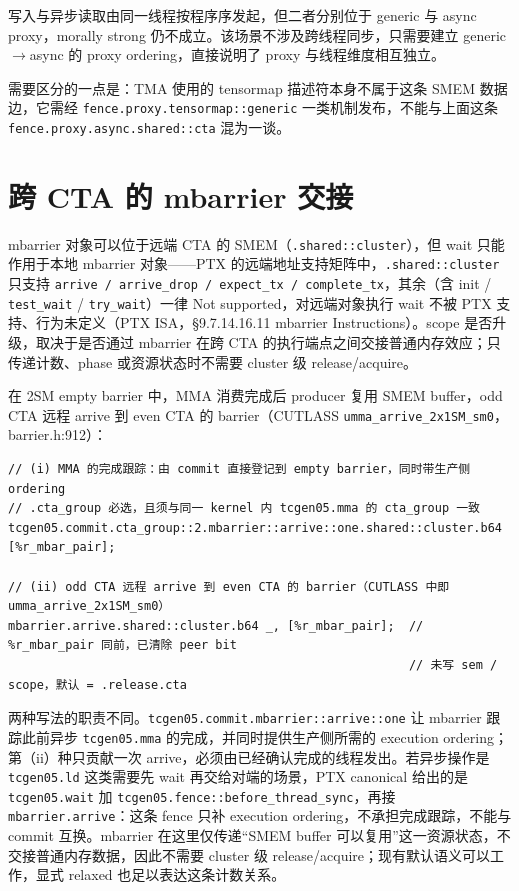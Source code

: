 写入与异步读取由同一线程按程序序发起，但二者分别位于 generic 与 async proxy，morally strong 仍不成立。该场景不涉及跨线程同步，只需要建立 generic$\rightarrow$async 的 proxy ordering，直接说明了 proxy 与线程维度相互独立。

需要区分的一点是：TMA 使用的 tensormap 描述符本身不属于这条 SMEM 数据边，它需经 \lstinline|fence.proxy.tensormap::generic| 一类机制发布，不能与上面这条 \lstinline|fence.proxy.async.shared::cta| 混为一谈。

\section{跨 CTA 的 mbarrier 交接}

mbarrier 对象可以位于远端 CTA 的 SMEM（\lstinline|.shared::cluster|），但 wait 只能作用于本地 mbarrier 对象——PTX 的远端地址支持矩阵中，\lstinline|.shared::cluster| 只支持 \lstinline|arrive / arrive_drop / expect_tx / complete_tx|，其余（含 init / \lstinline|test_wait| / \lstinline|try_wait|）一律 Not supported，对远端对象执行 wait 不被 PTX 支持、行为未定义（PTX ISA，§9.7.14.16.11 mbarrier Instructions）。scope 是否升级，取决于是否通过 mbarrier 在跨 CTA 的执行端点之间交接普通内存效应；只传递计数、phase 或资源状态时不需要 cluster 级 release/acquire。

在 2SM empty barrier 中，MMA 消费完成后 producer 复用 SMEM buffer，odd CTA 远程 arrive 到 even CTA 的 barrier（CUTLASS \lstinline|umma_arrive_2x1SM_sm0|，barrier.h:912）：

\begin{lstlisting}
// (i) MMA 的完成跟踪：由 commit 直接登记到 empty barrier，同时带生产侧 ordering
// .cta_group 必选，且须与同一 kernel 内 tcgen05.mma 的 cta_group 一致
tcgen05.commit.cta_group::2.mbarrier::arrive::one.shared::cluster.b64 [%r_mbar_pair];

// (ii) odd CTA 远程 arrive 到 even CTA 的 barrier（CUTLASS 中即 umma_arrive_2x1SM_sm0）
mbarrier.arrive.shared::cluster.b64 _, [%r_mbar_pair];  // %r_mbar_pair 同前，已清除 peer bit
                                                        // 未写 sem / scope，默认 = .release.cta
\end{lstlisting}

两种写法的职责不同。\lstinline|tcgen05.commit.mbarrier::arrive::one| 让 mbarrier 跟踪此前异步 \lstinline|tcgen05.mma| 的完成，并同时提供生产侧所需的 execution ordering；第（ii）种只贡献一次 arrive，必须由已经确认完成的线程发出。若异步操作是 \lstinline|tcgen05.ld| 这类需要先 wait 再交给对端的场景，PTX canonical 给出的是 \lstinline|tcgen05.wait| 加 \lstinline|tcgen05.fence::before_thread_sync|，再接 \lstinline|mbarrier.arrive|：这条 fence 只补 execution ordering，不承担完成跟踪，不能与 commit 互换。mbarrier 在这里仅传递“SMEM buffer 可以复用”这一资源状态，不交接普通内存数据，因此不需要 cluster 级 release/acquire；现有默认语义可以工作，显式 relaxed 也足以表达这条计数关系。

